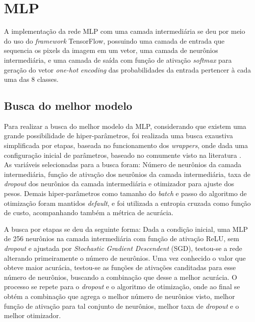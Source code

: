 \clearpage
\section{MLP}

A implementação da rede MLP com uma camada intermediária se deu por meio do uso do \textit{framework} TensorFlow, possuindo uma camada de entrada que sequencia os pixels da imagem em um vetor, uma camada de neurônios intermediária, e uma camada de saída com função de ativação \textit{softmax} para geração do vetor \textit{one-hot encoding} das probabilidades da entrada pertencer à cada uma das 8 classes.

\subsection{Busca do melhor modelo}

Para realizar a busca do melhor modelo da MLP, considerando que existem uma grande possibilidade de hiper-parâmetros, foi realizada uma busca exaustiva simplificada por etapas, baseada no funcionamento dos \textit{wrappers}, onde dada uma configuração inicial de parâmetros, baseado no comumente visto na literatura \cite{geron2019hands}. As variáveis selecionadas para a busca foram: Número de neurônios da camada intermediária, função de ativação dos neurônios da camada intermediária, taxa de \textit{dropout} dos neurônios da camada intermediária e otimizador para ajuste dos pesos. Demais hiper-parâmetros como tamanho do \textit{batch} e passo do algoritmo de otimização foram mantidos \textit{default}, e foi utilizada a entropia cruzada como função de custo, acompanhando também a métrica de acurácia.

A busca por etapas se deu da seguinte forma: Dada a condição inicial, uma MLP de 256 neurônios na camada intermediária com função de ativação ReLU, sem \textit{dropout} e ajustada por \textit{Stochastic Gradient Descendent} (SGD), testou-se a rede alterando primeiramente o número de neurônios. Uma vez conhecido o valor que obteve maior acurácia, testou-se as funções de ativações canditadas para esse número de neurônios, buscando a combinação que desse a melhor acurácia. O processo se repete para o \textit{dropout} e o algoritmo de otimização, onde ao final se obtém a combinação que agrega o melhor número de neurônios visto, melhor função de ativação para tal conjunto de neurônios, melhor taxa de \textit{dropout} e o melhor otimizador.

